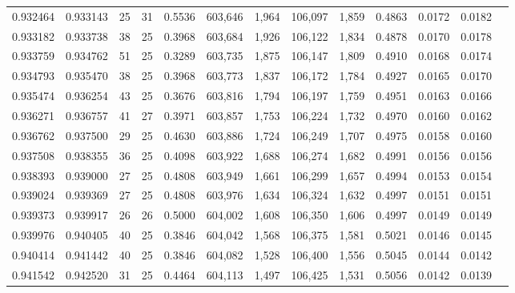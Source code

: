 \begin{tabular}{rrrrrrrrrrrrr}
0.932464 & 0.933143 &    25 &  31 &                                     0.5536 & 603,646 &   1,964 & 106,097 &   1,859 & 0.4863 & 0.0172 & 0.0182 \\
0.933182 & 0.933738 &    38 &  25 &                                     0.3968 & 603,684 &   1,926 & 106,122 &   1,834 & 0.4878 & 0.0170 & 0.0178 \\
0.933759 & 0.934762 &    51 &  25 &                                     0.3289 & 603,735 &   1,875 & 106,147 &   1,809 & 0.4910 & 0.0168 & 0.0174 \\
0.934793 & 0.935470 &    38 &  25 &                                     0.3968 & 603,773 &   1,837 & 106,172 &   1,784 & 0.4927 & 0.0165 & 0.0170 \\
0.935474 & 0.936254 &    43 &  25 &                                     0.3676 & 603,816 &   1,794 & 106,197 &   1,759 & 0.4951 & 0.0163 & 0.0166 \\
0.936271 & 0.936757 &    41 &  27 &                                     0.3971 & 603,857 &   1,753 & 106,224 &   1,732 & 0.4970 & 0.0160 & 0.0162 \\
0.936762 & 0.937500 &    29 &  25 &                                     0.4630 & 603,886 &   1,724 & 106,249 &   1,707 & 0.4975 & 0.0158 & 0.0160 \\
0.937508 & 0.938355 &    36 &  25 &                                     0.4098 & 603,922 &   1,688 & 106,274 &   1,682 & 0.4991 & 0.0156 & 0.0156 \\
0.938393 & 0.939000 &    27 &  25 &                                     0.4808 & 603,949 &   1,661 & 106,299 &   1,657 & 0.4994 & 0.0153 & 0.0154 \\
0.939024 & 0.939369 &    27 &  25 &                                     0.4808 & 603,976 &   1,634 & 106,324 &   1,632 & 0.4997 & 0.0151 & 0.0151 \\
0.939373 & 0.939917 &    26 &  26 &                                     0.5000 & 604,002 &   1,608 & 106,350 &   1,606 & 0.4997 & 0.0149 & 0.0149 \\
0.939976 & 0.940405 &    40 &  25 &                                     0.3846 & 604,042 &   1,568 & 106,375 &   1,581 & 0.5021 & 0.0146 & 0.0145 \\
0.940414 & 0.941442 &    40 &  25 &                                     0.3846 & 604,082 &   1,528 & 106,400 &   1,556 & 0.5045 & 0.0144 & 0.0142 \\
0.941542 & 0.942520 &    31 &  25 &                                     0.4464 & 604,113 &   1,497 & 106,425 &   1,531 & 0.5056 & 0.0142 & 0.0139 \\

\end{tabular}
